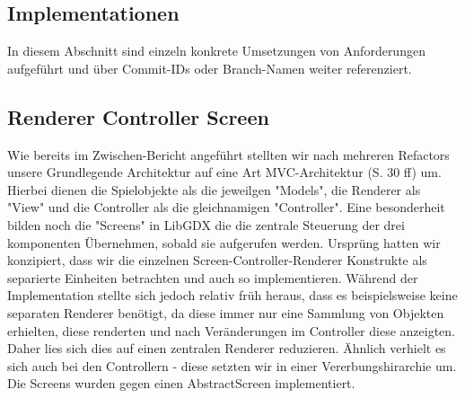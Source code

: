 \subsection{Implementationen}
In diesem Abschnitt sind einzeln konkrete Umsetzungen von Anforderungen aufgeführt und über Commit-IDs oder Branch-Namen weiter referenziert.

\subsection{Renderer Controller Screen}
Wie bereits im Zwischen-Bericht angeführt stellten wir nach mehreren Refactors unsere Grundlegende Architektur auf eine Art MVC-Architektur \cite{Design Patterns}(S. 30 ff) um. 
Hierbei dienen die Spielobjekte als die jeweilgen "Models", die Renderer als "View" und die Controller als die gleichnamigen "Controller". Eine besonderheit bilden noch die "Screens" in LibGDX die die zentrale Steuerung der drei komponenten Übernehmen, sobald sie aufgerufen werden.
Ursprüng hatten wir konzipiert, dass wir die einzelnen Screen-Controller-Renderer Konstrukte als separierte Einheiten betrachten und auch so implementieren. Während der Implementation stellte sich jedoch relativ früh heraus, dass es beispielsweise keine separaten Renderer benötigt, da diese immer nur eine Sammlung von Objekten erhielten, diese renderten und nach Veränderungen im Controller diese anzeigten. Daher lies sich dies auf einen zentralen Renderer reduzieren. Ähnlich verhielt es sich auch bei den Controllern - diese setzten wir in einer Vererbungshirarchie um. Die Screens wurden gegen einen AbstractScreen implementiert.

